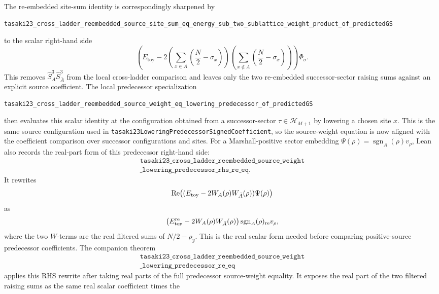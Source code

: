 \documentclass[a4paper,11pt]{article}
\begin{document}
The re-embedded site-sum identity is correspondingly sharpened by
\begin{Verbatim}
tasaki23_cross_ladder_reembedded_source_site_sum_eq_energy_sub_two_sublattice_weight_product_of_predictedGS
\end{Verbatim}
to the scalar right-hand side
\[
  \left(E_{\mathrm{toy}}
    -2
      \left(\sum_{x\in A}\left(\frac N2-\sigma_x\right)\right)
      \left(\sum_{x\notin A}\left(\frac N2-\sigma_x\right)\right)
  \right)\Phi_\sigma .
\]
This removes \(\hat S_A^3\hat S_{\bar A}^3\) from the local
cross-ladder comparison and leaves only the two re-embedded
successor-sector raising sums against an explicit source coefficient.
The local predecessor specialization
\begin{Verbatim}
tasaki23_cross_ladder_reembedded_source_weight_eq_lowering_predecessor_of_predictedGS
\end{Verbatim}
then evaluates this scalar identity at the configuration obtained from
a successor-sector \(\tau\in\mathcal H_{M+1}\) by lowering a chosen
site \(x\).  This is the same source configuration used in
\texttt{tasaki23LoweringPredecessorSignedCoefficient}, so the
source-weight equation is now aligned with the coefficient comparison
over successor configurations and sites.
For a Marshall-positive sector embedding
\(\Psi(\rho)=\operatorname{sgn}_A(\rho)v_\rho\), Lean also records the
real-part form of this predecessor right-hand side:
\[
\begin{gathered}
\texttt{tasaki23\_cross\_ladder\_reembedded\_source\_weight}\\
\texttt{\_lowering\_predecessor\_rhs\_re\_eq}.
\end{gathered}
\]
It rewrites
\[
  \operatorname{Re}\bigl((E_{\rm toy}-2W_A(\rho)W_{\bar A}(\rho))
    \Psi(\rho)\bigr)
\]
as
\[
  \bigl(E_{\rm toy}^{\rm re}-2W_A(\rho)W_{\bar A}(\rho)\bigr)
  \operatorname{sgn}_A(\rho)_{\rm re}v_\rho,
\]
where the two \(W\)-terms are the real filtered sums of
\(N/2-\rho_y\).  This is the real scalar form needed before comparing
positive-source predecessor coefficients.
The companion theorem
\[
\begin{gathered}
\texttt{tasaki23\_cross\_ladder\_reembedded\_source\_weight}\\
\texttt{\_lowering\_predecessor\_re\_eq}
\end{gathered}
\]
applies this RHS rewrite after taking real parts of the full
predecessor source-weight equality.  It exposes the real part of the
two filtered raising sums as the same real scalar coefficient times the
\end{document}
